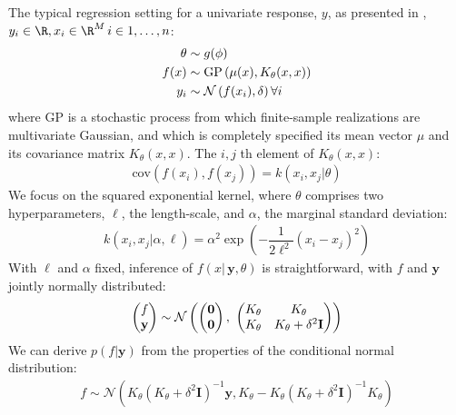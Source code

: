\documentclass{article}
\newcommand{\lp}{\ensuremath{\left(}}
\newcommand{\rp}{\ensuremath{\right)}}
\begin{document}
The typical regression setting for a univariate response, $y$, as presented in \citet{flaxman2015fast},
$y_i \in \R, x_i \in \R^M\, i \in {1,\dots,n}$:
\begin{align*}
  \theta & \sim g(\phi) \\
  f(x) & \sim \text{GP}\lp \mu(x),
  K_\theta(x, x) \rp \\
  y_i & \sim \mathcal{N}\lp f(x_i), \delta \rp \forall i \\
\end{align*}
where $\text{GP}$ is a stochastic process from which finite-sample realizations are
multivariate Gaussian, and which is completely specified its mean vector $\mu$
and its covariance matrix $K_\theta(x, x)$. The $i, j$ th
element of $K_\theta(x, x)$:
\begin{align*}
  \text{cov}(f(x_i), f(x_j)) = k(x_i, x_j | \theta) 
\end{align*}
We focus on the squared exponential kernel, where $\theta$ comprises
two hyperparameters, $\ell$, the length-scale, and $\alpha$, the marginal
standard deviation:
\begin{align} \label{kern}
  k(x_i, x_j | \alpha, \ell) = \alpha^2 
\exp \left(
	- \dfrac{1}{2\ell^2} (x_{i} - x_{j})^2
\right)
\end{align}
With $\ell$ and $\alpha$ fixed, inference of $f(x | \, \mathbf{y}, \theta)$ is
straightforward, with $f$ and $\mathbf{y}$ jointly normally distributed:
\begin{align*} \begin{pmatrix} f\\ \mathbf{y} \\ \end{pmatrix} \sim
\mathcal{N} \lp \begin{pmatrix} \mathbf{0} \\ \mathbf{0} \end{pmatrix} ,\,\,
  \begin{pmatrix} K_\theta &
  K_\theta  \\ K_\theta &
  K_\theta + \delta ^ 2 \mathbf{I}\\ \end{pmatrix} \rp
\end{align*}
We can derive $p(f | \mathbf{y})$ from the properties of the conditional normal
distribution: 
\begin{align*}
  f \sim
  \mathcal{N}(K_\theta  (K_\theta + \delta ^ 2 \mathbf{I})^{-1}\mathbf{y},  
  K_\theta - K_\theta (K_\theta + \delta ^ 2 \mathbf{I})^{-1}K_\theta)
\end{align*}
\end{document}
